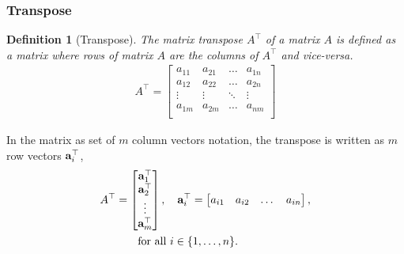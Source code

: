 \documentclass{article}
\newtheorem{defn}{Definition}
\begin{document}
\subsubsection{Transpose}
\begin{defn}[Transpose]
  The matrix transpose $A^\top$ of a matrix $A$ is defined as a matrix where
  rows of matrix $A$ are the columns  of $A^\top$ and vice-versa.
  \begin{align}
    A^\top  =  \begin{bmatrix}
      a_{11}  &  a_{21} &   \dots &  a_{1n} \\
      a_{12}  &  a_{22} &   \dots &  a_{2n} \\
      \vdots  & \vdots &   \ddots  &  \vdots   \\
      a_{1m}  &  a_{2m} &   \dots &  a_{nm} \\
    \end{bmatrix}
  \end{align}
\end{defn}

In  the matrix as set of  $m$ column  vectors notation, the transpose is written as $m$
row  vectors $\mathbf{a}_i^\top$,
%
\begin{align}
  A^\top  &=  \begin{bmatrix}
    \mathbf{a}_1^\top \\ \mathbf{a}_2^\top \\ \vdots \\  \mathbf{a}_m^\top
  \end{bmatrix},
  \quad
  \mathbf{a}_i^\top = \begin{bmatrix}
    a_{i1}  & a_{i2}  &   \dots &  a_{in}
  \end{bmatrix},
                                  \notag \\
  &\qquad \text{for all } i \in \{1, \dots, n\}.
\end{align}
%
\end{document}
